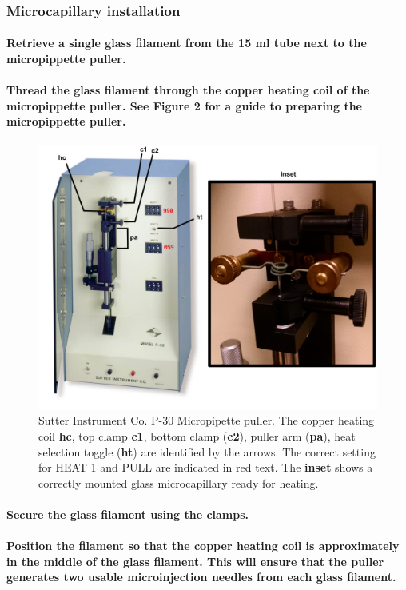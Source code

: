 \documentclass[11pt]{article}
\begin{document}
\subsubsection{{\sffamily } Microcapillary installation}
\label{sec:orgheadline40}
\paragraph{{\sffamily } Retrieve a single glass filament from the 15 ml tube next to the micropippette puller.}
\label{sec:orgheadline20}
\paragraph{{\sffamily } Thread the glass filament through the copper heating coil of the micropippette puller. See \textbf{Figure 2} for a guide to preparing the micropippette puller.}
\label{sec:orgheadline21}

\begin{figure}
\centering
\includegraphics[width=0.6\linewidth]{./img/figure2.pdf}
\caption{Sutter Instrument Co. P-30 Micropipette puller. The copper heating coil \textbf{hc}, top clamp \textbf{c1}, bottom clamp (\textbf{c2}), puller arm (\textbf{pa}), heat selection toggle (\textbf{ht}) are identified by the arrows. The correct setting for HEAT 1 and PULL are indicated in red text. The \textbf{inset} shows a correctly mounted glass microcapillary ready for heating.}
\end{figure}

\paragraph{{\sffamily } Secure the glass filament using the clamps.}
\label{sec:orgheadline22}
\paragraph{{\sffamily } Position the filament so that the copper heating coil is approximately in the middle of the glass filament. This will ensure that the puller generates two usable microinjection needles from each glass filament.}
\label{sec:orgheadline23}
\end{document}
